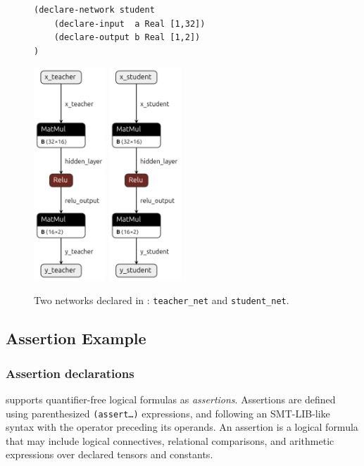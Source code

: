 \begin{figure}[h!]
\begin{minipage}[c]{0.57\textwidth}
\begin{lstlisting}[style=lbnf]
(declare-network student
    (declare-input  a Real [1,32])
    (declare-output b Real [1,2])
)\end{lstlisting}
    \end{minipage}
    \begin{minipage}[c]{0.43\textwidth}
        \centering
        \includegraphics[height=8cm]{imgs/teacher_net.onnx.png}
        \vspace{0.5cm} 
        \includegraphics[height=8cm]{imgs/student_net.onnx.png}
    \end{minipage}
    \caption{Two networks declared in \vnnlib{}: \texttt{teacher\_net} and \texttt{student\_net}.}
    \label{fig:multi_network}
\end{figure}

\subsection{Assertion Example}

\subsubsection*{Assertion declarations}
\label{sec:assertion-declarations}
\vnnlib{} supports quantifier-free logical formulas as \textit{assertions}. Assertions are defined using parenthesized \texttt{(assert\ldots)} expressions, and following an SMT-LIB-like syntax with the 
operator preceding its operands. An assertion is a logical formula that may include logical connectives, relational comparisons, and arithmetic expressions over declared tensors and constants.

